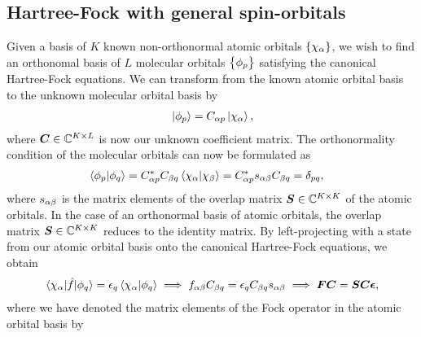         \subsection{Hartree-Fock with general spin-orbitals}
            \label{subsec:ghf}
            Given a basis of $K$ known non-orthonormal atomic orbitals
            $\left\{ \chi_{\alpha} \right\}$, we wish to find an orthonomal basis of $L$
            molecular orbitals $\left\{ \phi_{p} \right\}$ satisfying the canonical
            Hartree-Fock equations.
            We can transform from the known atomic orbital basis to the unknown
            molecular orbital basis by
            \begin{align}
                \ket*{\phi_p} = C_{\alpha p}\ket*{\chi_{\alpha}},
            \end{align}
            where $\boldsymbol{C} \in \mathbb{C}^{K\times L}$ is now our unknown
            coefficient matrix.
            The orthonormality condition of the molecular orbitals can now be
            formulated as
            \begin{align}
                \braket*{\phi_p}{\phi_q}
                &= C^{*}_{\alpha p} C_{\beta q}
                \braket*{\chi_{\alpha}}{\chi_{\beta}}
                = C^{*}_{\alpha p} s_{\alpha \beta}
                C_{\beta q}
                = \delta_{pq},
            \end{align}
            where $s_{\alpha\beta}$ is the matrix elements of the
            overlap matrix $\boldsymbol{S} \in \mathbb{C}^{K\times K}$ of the
            atomic orbitals.
            In the case of an orthonormal basis of atomic orbitals, the overlap
            matrix $\boldsymbol{S} \in \mathbb{C}^{K \times K}$ reduces to the identity
            matrix.
            By left-projecting with a state from our atomic orbital basis onto
            the canonical Hartree-Fock equations, we obtain
            \begin{gather}
                \mel*{\chi_{\alpha}}{\hat{f}}{\phi_q}
                = \epsilon_{q} \braket*{\chi_{\alpha}}{\phi_q}
                \implies
                f_{\alpha\beta}
                C_{\beta q}
                = \epsilon_q C_{\beta q} s_{\alpha \beta}
                \implies
                \boldsymbol{F} \boldsymbol{C} = \boldsymbol{S} \boldsymbol{C} \boldsymbol{\epsilon},
                \label{eq:roothan-hall-general}
            \end{gather}
            where we have denoted the matrix elements of the Fock operator in the
            atomic orbital basis by
